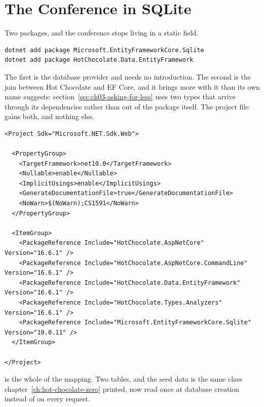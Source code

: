 \section{The Conference in SQLite}
\label{sec:ch03-the-conference-in-sqlite}

Two packages, and the conference stops living in a static field.

\begin{verbatim}
dotnet add package Microsoft.EntityFrameworkCore.Sqlite
dotnet add package HotChocolate.Data.EntityFramework
\end{verbatim}

%
The first is the database provider and needs no introduction. The second is the
join between Hot Chocolate and EF Core, and it brings more with it than its own
name suggests: section~\ref{sec:ch03-asking-for-less} uses two types that
arrive through its dependencies rather than out of the package itself. The
project file gains both, and nothing else.

\begin{verbatim}
<Project Sdk="Microsoft.NET.Sdk.Web">

  <PropertyGroup>
    <TargetFramework>net10.0</TargetFramework>
    <Nullable>enable</Nullable>
    <ImplicitUsings>enable</ImplicitUsings>
    <GenerateDocumentationFile>true</GenerateDocumentationFile>
    <NoWarn>$(NoWarn);CS1591</NoWarn>
  </PropertyGroup>

  <ItemGroup>
    <PackageReference Include="HotChocolate.AspNetCore" Version="16.6.1" />
    <PackageReference Include="HotChocolate.AspNetCore.CommandLine" Version="16.6.1" />
    <PackageReference Include="HotChocolate.Data.EntityFramework" Version="16.6.1" />
    <PackageReference Include="HotChocolate.Types.Analyzers" Version="16.6.1" />
    <PackageReference Include="Microsoft.EntityFrameworkCore.Sqlite" Version="10.0.11" />
  </ItemGroup>

</Project>
\end{verbatim}

%
 is the whole of the mapping. Two tables, and the
seed data is the same  class
chapter~\ref{ch:hot-chocolate-zero} printed, now read once at database creation
instead of on every request.

